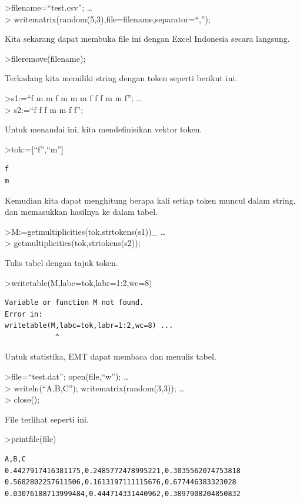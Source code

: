 \documentclass[
]{book}
\begin{document}
\textgreater filename=``test.csv''; \ldots{}\\
\textgreater{} writematrix(random(5,3),file=filename,separator=``,'');

Kita sekarang dapat membuka file ini dengan Excel Indonesia secara langsung.

\textgreater fileremove(filename);

Terkadang kita memiliki string dengan token seperti berikut ini.

\textgreater s1:=``f m m f m m m f f f m m f''; \ldots{}\\
\textgreater{} s2:=``f f f m m f f'';

Untuk menandai ini, kita mendefinisikan vektor token.

\textgreater tok:={[}``f'',``m''{]}

\begin{verbatim}
f
m
\end{verbatim}

Kemudian kita dapat menghitung berapa kali setiap token muncul dalam string, dan memasukkan hasilnya ke dalam tabel.

\textgreater M:=getmultiplicities(tok,strtokens(s1))\_ \ldots{}\\
\textgreater{} getmultiplicities(tok,strtokens(s2));

Tulis tabel dengan tajuk token.

\textgreater writetable(M,labc=tok,labr=1:2,wc=8)

\begin{verbatim}
Variable or function M not found.
Error in:
writetable(M,labc=tok,labr=1:2,wc=8) ...
            ^
\end{verbatim}

Untuk statistika, EMT dapat membaca dan menulis tabel.

\textgreater file=``test.dat''; open(file,``w''); \ldots{}\\
\textgreater{} writeln(``A,B,C''); writematrix(random(3,3)); \ldots{}\\
\textgreater{} close();

File terlihat seperti ini.

\textgreater printfile(file)

\begin{verbatim}
A,B,C
0.4427917416381175,0.2485772478995221,0.3035562074753818
0.5682802257611506,0.1613197111115676,0.677446383323028
0.03076188713999484,0.444714331440962,0.3897908204850832
\end{verbatim}
\end{document}
